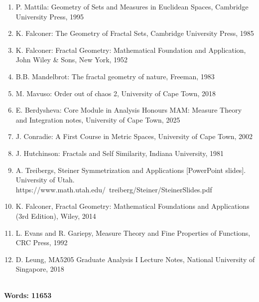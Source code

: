 \documentclass{article}
\theoremstyle{plain}
\theoremstyle{definition}
\theoremstyle{remark}
\begin{document}
\begin{enumerate}

\item P. Mattila: Geometry of Sets and Measures in Euclidean Spaces, Cambridge
University Press, 1995
\item K. Falconer: The Geometry of Fractal Sets, Cambridge University Press, 1985
\item K. Falconer: Fractal Geometry: Mathematical Foundation and Application, John
Wiley \& Sons, New York, 1952
\item B.B. Mandelbrot: The fractal geometry of nature, Freeman, 1983
\item M. Mavuso: Order out of chaos 2, University of Cape Town, 2018
\item E. Berdysheva: Core Module in Analysis Honours MAM: Measure Theory and Integration notes, University of Cape Town, 2025
\item J. Conradie: A First Course in Metric Spaces, University of Cape Town, 2002
\item J. Hutchinson: Fractals and Self Similarity, Indiana University, 1981
\item A. Treibergs, Steiner Symmetrization and Applications [PowerPoint slides]. University of Utah. \\https://www.math.utah.edu/~treiberg/Steiner/SteinerSlides.pdf
\item K. Falconer, Fractal Geometry: Mathematical Foundations and Applications (3rd Edition), Wiley, 2014
\item L. Evans and R. Gariepy, Measure Theory and Fine Properties of Functions, CRC Press, 1992
\item D. Leung, MA5205 Graduate Analysis I Lecture Notes, National University of Singapore, 2018

\end{enumerate}

~\\ \textbf{Words: 11653}
\end{document}
